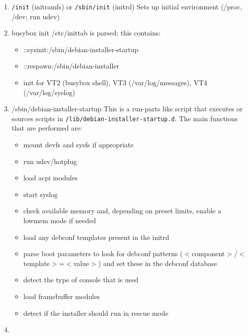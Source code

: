 \documentclass[a4paper,10pt]{article}
\begin{document}
\begin{enumerate}
\item
  \begin{flushleft}
\texttt{/init} (initramfs) or \texttt{/sbin/init} (initrd) \linebreak
Sets up initial environment (/proc, /dev; run udev)
  \end{flushleft}
\item
  \begin{flushleft}
busybox init \linebreak
/etc/inittab is parsed; this contains:
  \end{flushleft}
  \begin{itemize}
\item ::sysinit:/sbin/debian-installer-startup
\item ::respawn:/sbin/debian-installer
\item init for VT2 (busybox shell), VT3 (/var/log/messages), VT4 (/var/log/syslog)
  \end{itemize}
\item
  \begin{flushleft}
/sbin/debian-installer-startup \linebreak
This is a run-parts like script that executes or sources scripts in \texttt{/lib/debian-installer-startup.d}. The main functions that are performed are:
  \end{flushleft}
  \begin{itemize}
\item mount devfs and sysfs if appropriate
\item run udev/hotplug
\item load acpi modules 
\item start syslog 
\item check available memory and, depending on preset limits, enable a lowmem mode if needed 
\item load any debconf templates present in the initrd 
\item parse boot parameters to look for debconf patterns ($<$component$>$/$<$template$>$=$<$value$>$) and set these in the debconf database
\item detect the type of console that is used
\item load framebuffer modules
\item detect if the installer should run in rescue mode
  \end{itemize}
\item
  \begin{flushleft}

\end{flushleft}
\end{enumerate}
\end{document}
